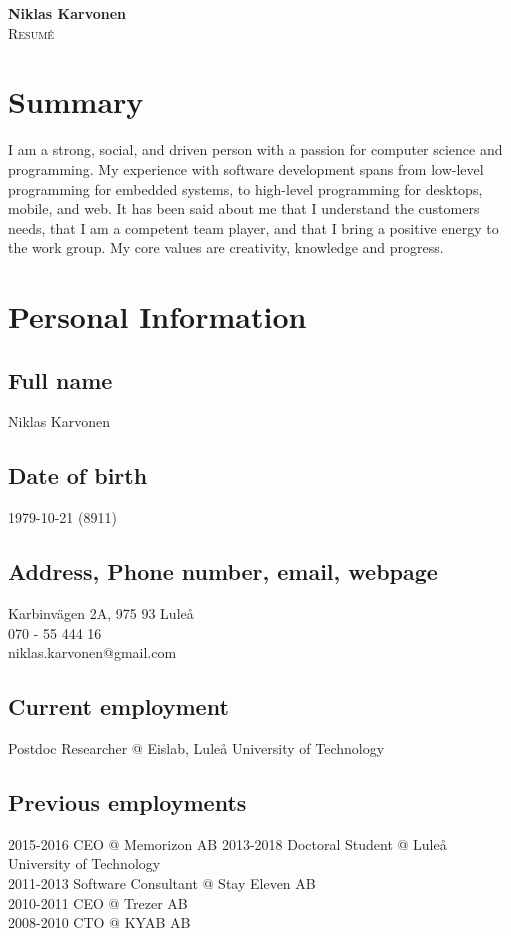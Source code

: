 \documentclass{article}
\makeatletter
\newlength\drop
\newcommand*\titleM{\begingroup%
\setlength\drop{0.08\textheight}
\centering
\vspace*{\drop}
{\Huge\bfseries Niklas Karvonen}\\[\baselineskip]
{\scshape Resumé}\\[\baselineskip]
\vfill
{\large\scshape }\par
\vfill
{\scshape \@date}\par
\vspace*{2\drop}
\endgroup}
\makeatother
\begin{document}
\begin{titlingpage}
\titleM
\end{titlingpage}
\newpage

\tableofcontents
\newpage

\section{Summary}
I am a strong, social, and driven person with a passion for computer science and programming. My experience with software development spans from low-level programming for embedded systems, to high-level programming for desktops, mobile, and web. It has been said about me that I understand the customers needs, that I am a competent team player, and that I bring a positive energy to the work group. My core values are creativity, knowledge and progress.

\section{Personal Information}


\subsection{Full name} Niklas Karvonen  \\
\subsection{Date of birth} 1979-10-21 (8911) \\
\subsection{Address, Phone number, email, webpage}
Karbinvägen 2A, 975 93 Luleå \\
070 - 55 444 16 \\ 
niklas.karvonen@gmail.com \\

\subsection{Current employment} Postdoc Researcher @ Eislab, Luleå University of Technology \\
\subsection{Previous employments}
2015-2016 CEO @ Memorizon AB
2013-2018 Doctoral Student @ Luleå University of Technology \\
2011-2013 Software Consultant @ Stay Eleven AB \\
2010-2011 CEO @ Trezer AB \\
2008-2010 CTO @ KYAB AB \\
\end{document}
